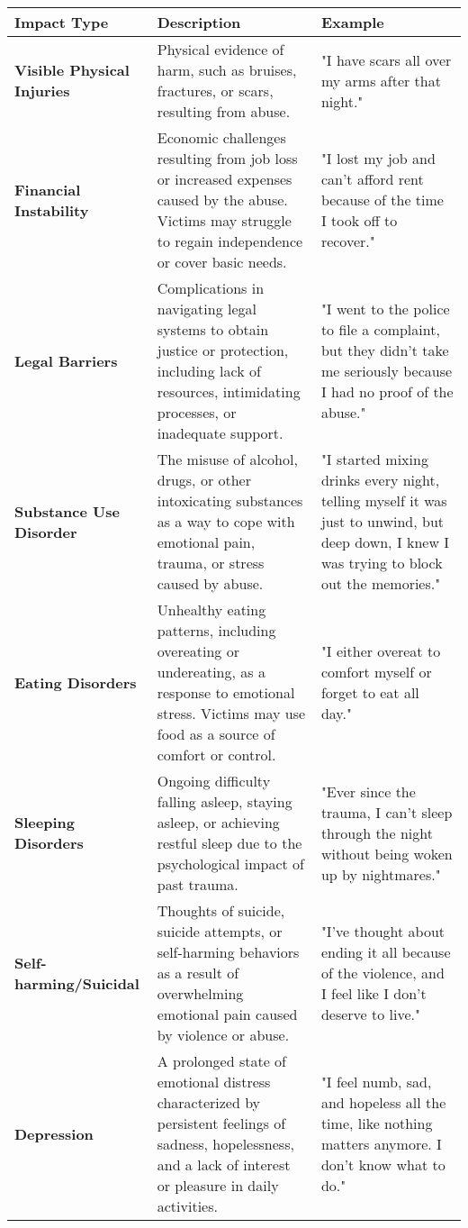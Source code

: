 \documentclass[11pt]{article}
\begin{document}
\begin{table}[htb]
    \centering
    \begin{tabular}{|p{4cm}|p{4cm}|p{8cm}|}
    \hline
    \textbf{Impact Type} & \textbf{Description} & \textbf{Example} \\ \hline
    \textbf{Visible Physical Injuries} & Physical evidence of harm, such as bruises, fractures, or scars, resulting from abuse. & "I have scars all over my arms after that night." \\ \hline
    \textbf{Financial Instability} & Economic challenges resulting from job loss or increased expenses caused by the abuse. Victims may struggle to regain independence or cover basic needs. & "I lost my job and can't afford rent because of the time I took off to recover." \\ \hline
    \textbf{Legal Barriers} & Complications in navigating legal systems to obtain justice or protection, including lack of resources, intimidating processes, or inadequate support. & "I went to the police to file a complaint, but they didn't take me seriously because I had no proof of the abuse." \\ \hline
    \textbf{Substance Use Disorder} & The misuse of alcohol, drugs, or other intoxicating substances as a way to cope with emotional pain, trauma, or stress caused by abuse. & "I started mixing drinks every night, telling myself it was just to unwind, but deep down, I knew I was trying to block out the memories." \\ \hline
    \textbf{Eating Disorders} & Unhealthy eating patterns, including overeating or undereating, as a response to emotional stress. Victims may use food as a source of comfort or control. & "I either overeat to comfort myself or forget to eat all day." \\ \hline
    \textbf{Sleeping Disorders} & Ongoing difficulty falling asleep, staying asleep, or achieving restful sleep due to the psychological impact of past trauma. & "Ever since the trauma, I can't sleep through the night without being woken up by nightmares." \\ \hline
    \textbf{Self-harming/Suicidal} & Thoughts of suicide, suicide attempts, or self-harming behaviors as a result of overwhelming emotional pain caused by violence or abuse. & "I've thought about ending it all because of the violence, and I feel like I don't deserve to live." \\ \hline
    \textbf{Depression} & A prolonged state of emotional distress characterized by persistent feelings of sadness, hopelessness, and a lack of interest or pleasure in daily activities. & "I feel numb, sad, and hopeless all the time, like nothing matters anymore. I don't know what to do." \\ \hline

\end{tabular}
\end{table}
\end{document}
